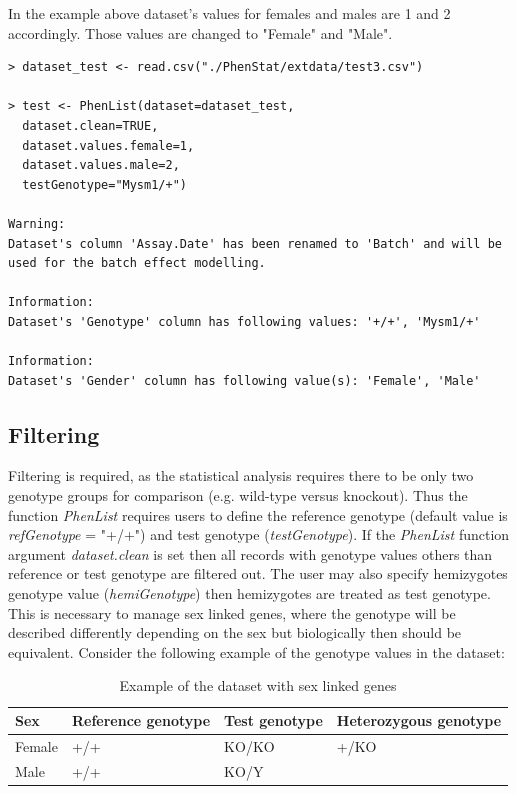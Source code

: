 \documentclass[12pt,a4paper]{article}
\begin{document}
In the example above dataset's values for females and males are 1 and 2 accordingly. Those values are changed to "Female" and "Male".  
\begingroup
    \fontsize{8pt}{12pt}\selectfont
\begin{verbatim}
> dataset_test <- read.csv("./PhenStat/extdata/test3.csv")

> test <- PhenList(dataset=dataset_test, 
  dataset.clean=TRUE, 
  dataset.values.female=1, 
  dataset.values.male=2, 
  testGenotype="Mysm1/+")

Warning:
Dataset's column 'Assay.Date' has been renamed to 'Batch' and will be used for the batch effect modelling.

Information:
Dataset's 'Genotype' column has following values: '+/+', 'Mysm1/+'

Information:
Dataset's 'Gender' column has following value(s): 'Female', 'Male'  
\end{verbatim}
\endgroup

\subsection{Filtering}
\label{section:Filtering}
Filtering is required, as the statistical analysis requires there to be only two genotype groups for comparison (e.g. wild-type versus knockout). 
Thus the function \textit{PhenList} requires users to define the reference genotype (default value is \textit{refGenotype} = "+\slash+") and test genotype (\textit{testGenotype}). 
If the \textit{PhenList} function argument \textit{dataset.clean} is set then all records with genotype values others than reference or test genotype are filtered out. 
The user may also specify hemizygotes genotype value (\textit{hemiGenotype}) then hemizygotes are treated as test genotype. 
This is necessary to manage sex linked genes, where the genotype will be described differently depending on the sex but biologically then should be equivalent. 
Consider the following example of the genotype values in the dataset:
\begin{table}[!h]
\begin{center}
\begin{tabular}{| l | l | l | l |}
  \hline
Sex&Reference genotype&Test genotype&Heterozygous genotype\\\hline
Female&+\slash +&KO\slash KO&+\slash KO\\
Male&+\slash +&KO\slash Y& \\
\hline  
\end{tabular}
\caption{Example of the dataset with sex linked genes}\label{table:01}
\end{center}
\end{table}
\end{document}
